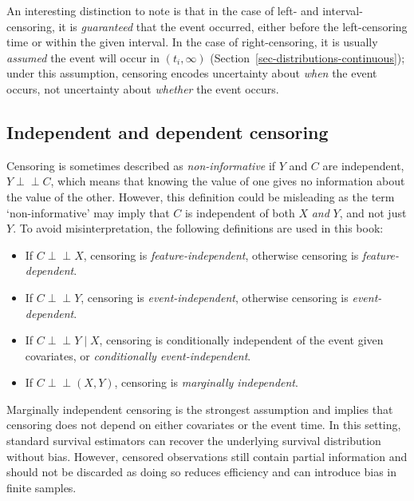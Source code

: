 \documentclass[
  letterpaper,
  krantz2]{style/krantz}
\providecommand{\tightlist}{%
  \setlength{\itemsep}{0pt}\setlength{\parskip}{0pt}}
\begin{document}
An interesting distinction to note is that in the case of left- and
interval-censoring, it is \emph{guaranteed} that the event occurred,
either before the left-censoring time or within the given interval. In
the case of right-censoring, it is usually \emph{assumed} the event will
occur in \((t_i, \infty)\) (Section~\ref{sec-distributions-continuous});
under this assumption, censoring encodes uncertainty about \emph{when}
the event occurs, not uncertainty about \emph{whether} the event occurs.

\subsection{Independent and dependent
censoring}\label{independent-and-dependent-censoring}

Censoring is sometimes described as
\emph{non-informative} if \(Y\) and
\(C\) are independent,
\(Y \perp \!\!\! \perp C\), which means that knowing the value of one
gives no information about the value of the other. However, this
definition could be misleading as the term `non-informative' may imply
that \(C\) is independent of both \(X\) \emph{and} \(Y\), and not just
\(Y\). To avoid misinterpretation, the following definitions are used in
this book:

\begin{itemize}
\tightlist
\item
  If \(C \perp \!\!\! \perp X\), censoring is
  \emph{feature-independent}, otherwise censoring is
  \emph{feature-dependent}.
\item
  If \(C \perp \!\!\! \perp Y\), censoring is \emph{event-independent},
  otherwise censoring is \emph{event-dependent}.
\item
  If \(C \perp \!\!\! \perp Y  \mid  X\), censoring is conditionally
  independent of the event given covariates, or \emph{conditionally
  event-independent}.
\item
  If \(C \perp \!\!\! \perp(X,Y)\), censoring is \emph{marginally
  independent}.
\end{itemize}

Marginally independent censoring is the strongest assumption and implies
that censoring does not depend on either covariates or the event time.
In this setting, standard survival estimators can recover the underlying
survival distribution without bias. However, censored observations still
contain partial information and should not be discarded as doing so
reduces efficiency and can introduce bias in finite samples.
\end{document}
